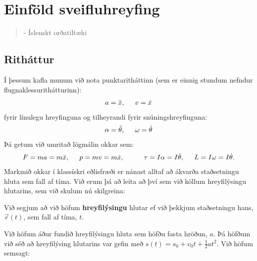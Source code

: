 
\chapter{Einföld sveifluhreyfing}

\begin{quote}
    \textit{}
    \begin{flushright}
    - Íslenskt orðatiltæki
    \end{flushright}
\end{quote}


\section{Ritháttur}

Í þessum kafla munum við nota punktaritháttinn (sem er einnig stundum nefndur flugnaklessurithátturinn):
\begin{align*}
    a = \Ddot{x}, \hspace{0.5cm} v = \dot{x}
\end{align*}
fyrir línulegu hreyfinguna og tilheyrandi fyrir snúningshreyfinguna:
\begin{align*}
    \alpha = \Ddot{\theta}, \hspace{0.5cm} \omega = \dot{\theta}
\end{align*}
Þá getum við umritað lögmálin okkar sem:
\begin{align*}
    F = ma = m \Ddot{x}, \hspace{0.5cm} p = mv = m\dot{x}, \hspace{1cm} \tau = I\alpha = I\Ddot{\theta}, \hspace{0.5cm} L = I\omega = I\dot{\theta}.
\end{align*}
Markmið okkar í klassískri eðlisfræði er nánast alltaf að ákvarða staðsetningu hluta sem fall af tíma. Við erum þá að leita að því sem við köllum hreyfilýsingu hlutarins, sem við skulum nú skilgreina:

\begin{tcolorbox}
\begin{definition}
Við segjum að við höfum \textbf{hreyfilýsingu} hlutar ef við þekkjum staðsetningu hans, $\Vec{r}(t)$, sem fall af tíma, $t$.
\end{definition}
\end{tcolorbox}

Við höfum áður fundið hreyfilýsingu hluta sem höfðu fasta hröðun, $a$. Þá höfðum við séð að hreyfilýsing hlutarins var gefin með $s(t) = s_0 + v_0 t + \frac{1}{2}at^2$. Við höfum semsagt:

